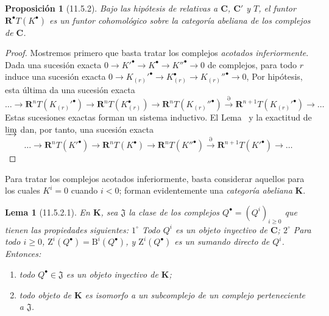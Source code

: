 \documentclass[10pt,oneside,openany]{book}
\theoremstyle{egaenv}\newtheorem*{env}{---}
\theoremstyle{egastatement}
\newtheorem*{proposition}{Proposición}
\newtheorem*{lemma}{Lema}
\theoremstyle{egadescription}
\newcommand{\oldpage}[2][]{\marginnote{\normalfont\scriptsize\textbf{#1}\,|\,#2}\ignorespaces}
\renewcommand{\geq}{\geqslant}
\begin{document}
\begin{proposition}[11.5.2]
\label{0.11.5.2}
\label{0.11.5.2-fr}
Bajo las hipótesis de \textup{} relativas a $\boldsymbol{C}$, $\boldsymbol{C}'$ y $T$, el funtor $\mathbf R^\bullet T(K^\bullet)$ es un funtor cohomológico sobre la categoría abeliana de los complejos de $\boldsymbol{C}$.
\end{proposition}

\begin{proof}
Mostremos primero que basta tratar los complejos \emph{acotados inferiormente}.
Dada una sucesión exacta
$0\longrightarrow K'^\bullet\longrightarrow K^\bullet\longrightarrow K''^\bullet\longrightarrow0$
de complejos, para todo $r$ induce una sucesión exacta
$0\longrightarrow K_{(r)}'^\bullet\longrightarrow K_{(r)}^\bullet\longrightarrow K_{(r)}''^\bullet\longrightarrow0$,
Por hipótesis, esta última da una sucesión exacta
\[
  \ldots\longrightarrow\mathbf R^nT(K_{(r)}'^\bullet)
  \longrightarrow\mathbf R^nT(K_{(r)}^\bullet)
  \longrightarrow\mathbf R^nT(K_{(r)}''^\bullet)
  \xrightarrow{\partial}\mathbf R^{n+1}T(K_{(r)}'^\bullet)
  \longrightarrow\ldots
\]
Estas sucesiones exactas forman un sistema inductivo.
El Lema~ y la exactitud de $\varinjlim$ dan, por tanto, una sucesión exacta
\[
  \ldots\longrightarrow\mathbf R^nT(K'^\bullet)
  \longrightarrow\mathbf R^nT(K^\bullet)
  \longrightarrow\mathbf R^nT(K''^\bullet)
  \xrightarrow{\partial}\mathbf R^{n+1}T(K'^\bullet)
  \longrightarrow\ldots
\]
\end{proof}

Para tratar los complejos acotados inferiormente, basta considerar aquellos para los cuales $K^i=0$ cuando $i<0$; forman evidentemente una \emph{categoría abeliana} $\boldsymbol{K}$.

\begin{lemma}[11.5.2.1]
\label{0.11.5.2.1}
\label{0.11.5.2.1-fr}
En $\boldsymbol{K}$, sea $\mathfrak J$ la clase de los complejos $Q^\bullet=(Q^i)_{i\geq0}$ que tienen las
\oldpage[0\textsubscript{III}]{37}
propiedades siguientes: $1^\circ$ Todo $Q^i$ es un objeto inyectivo de $\boldsymbol{C}$; $2^\circ$ Para todo $i\geq0$, $\mathrm Z^i(Q^\bullet)=\mathrm B^i(Q^\bullet)$, y $\mathrm Z^i(Q^\bullet)$ es un sumando directo de $Q^i$.
Entonces:
\begin{enumerate}
  \item[{\rm(i)}] todo $Q^\bullet\in\mathfrak J$ es un objeto inyectivo de $\boldsymbol{K}$;
  \item[{\rm(ii)}] todo objeto de $\boldsymbol{K}$ es isomorfo a un subcomplejo de un complejo perteneciente a $\mathfrak J$.
\end{enumerate}
\end{lemma}
\end{document}
